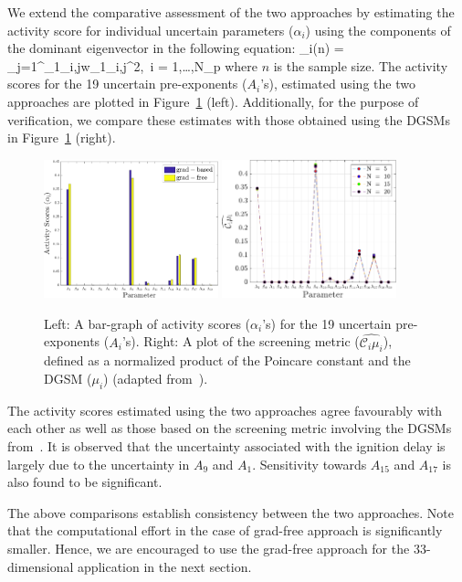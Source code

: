 We extend the comparative assessment of the two approaches by estimating the activity score for individual
uncertain parameters ($\alpha_i$) using
the components of the dominant eigenvector in the following equation:
%
\be
\alpha_i(n) = \sum\limits_{j=1}^{}\Lambda_{1_{i,j}}w_{1_{i,j}}^2,~i = 1,\ldots,N_p
\ee
%
where $n$ is the sample size. The activity scores for the 19 uncertain pre-exponents ($A_i$'s), estimated using
the two approaches are plotted in Figure~\ref{fig:comp_as} (left). Additionally, for the purpose of verification, we 
compare these estimates with those obtained using the DGSMs~\cite{Vohra:2018} in 
Figure~\ref{fig:comp_as} (right). 
%
\begin{figure}[htbp]
 \begin{center}
  \includegraphics[width=0.45\textwidth]{./Figures/comp_as}
  \includegraphics[width=0.45\textwidth]{./Figures/ub_conv_kinetics_rich}
\caption{Left: A bar-graph of activity scores ($\alpha_i$'s) for the 19 uncertain pre-exponents ($A_i$'s).
Right: A plot of the screening metric ($\widehat{\mathcal{C}_i\mu_i}$), defined as a normalized product of the
Poincare constant and the DGSM ($\mu_i$) (adapted from~\cite{Vohra:2018}).}
\label{fig:comp_as}
\end{center}
\end{figure}
%
The activity scores estimated using the two approaches agree favourably with each other as well as those
based on the screening metric involving the DGSMs from~\cite{Vohra:2018}. It is observed that the uncertainty
associated with the ignition delay is largely due to the uncertainty in $A_9$ and $A_1$. Sensitivity towards
$A_{15}$ and $A_{17}$ is also found to be significant. 

The above comparisons establish consistency between the two approaches. Note that the computational
effort in the case of grad-free approach is significantly smaller. Hence, we are encouraged to use the
grad-free approach for the 33-dimensional application in the next section. 



